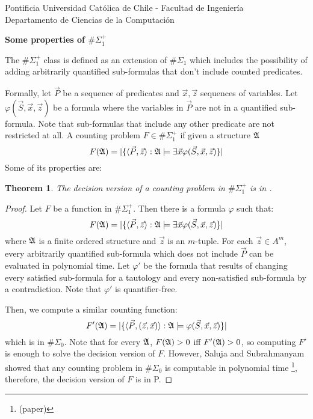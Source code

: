 \documentclass[12pt]{article}
\def\A{{\frak A}}
\newtheorem{theo}{Theorem}
\begin{document}
\begin{flushleft}
{\footnotesize Pontificia Universidad Cat\'olica de Chile - Facultad de Ingenier\'ia\\
Departamento de Ciencias de la Computaci\'on\\
}
\end{flushleft}
\begin{center}
{ \LARGE \bf
  Some properties of $\#\Sigma_1^{+}$
}
\end{center}

The $\#\Sigma_1^{+}$ class is defined as an extension of $\#\Sigma_1$ which includes the possibility of adding arbitrarily quantified sub-formulas that don't include counted predicates.

Formally, let $\vec{P}$ be a sequence of predicates and $\vec{x},\vec{z}$ sequences of variables. Let $\varphi(\vec{S},\vec{x},\vec{z})$ be a formula where the variables in $\vec{P}$ are not in a quantified sub-formula. Note that sub-formulas that include any other predicate are not restricted at all. A counting problem $F \in \#\Sigma_1^{+}$ if given a structure $\A$
$$
F(\A) = \vert \{ \langle\vec{P},\vec{z}\rangle :\A \models \exists \vec{x} \varphi(\vec{S},\vec{x},\vec{z}) \} \vert
$$ 
Some of its properties are:

\begin{theo}
The decision version of a counting problem in $\#\Sigma_1^{+}$ is in .
\end{theo}
\begin{proof}
Let $F$ be a function in $\#\Sigma_1^{+}$. Then there is a formula $\varphi$ such that:
$$
F(\A) = \vert \{ \langle\vec{P},\vec{z}\rangle :\A \models \exists \vec{x} \varphi(\vec{S},\vec{x},\vec{z}) \} \vert
$$ 
where $\A$ is a finite ordered structure and $\vec{z}$ is an $m$-tuple. For each $\vec{z} \in A^m$, every arbitrarily quantified sub-formula which does not include $\vec{P}$ can be evaluated in polynomial time. Let $\varphi'$ be the formula that results of changing every satisfied sub-formula for a tautology and every non-satisfied sub-formula by a contradiction. Note that $\varphi'$ is quantifier-free.

Then, we compute a similar counting function:
$$
F'(\A) = \vert \{ \langle\vec{P},(\vec{z},\vec{x})\rangle :\A \models \varphi(\vec{S},\vec{x},\vec{z}) \} \vert
$$ 
which is in $\#\Sigma_0$. Note that for every $\A$, $F(\A) > 0$ iff $F'(\A) > 0$, so computing $F'$ is enough to solve the decision version of $F$. However, Saluja and Subrahmanyam showed that any counting problem in $\#\Sigma_0$ is computable in polynomial time \footnote[1]{(paper)}, therefore, the decision version of $F$ is in P.
\end{proof}
\end{document}
